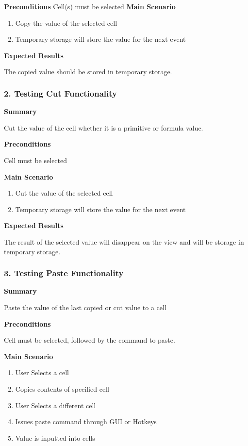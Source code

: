 \documentclass[12pt]{article}
\begin{document}
\noindent
{\bf Preconditions}
Cell(s) must be selected
\noindent
{\bf Main Scenario}
\begin{enumerate}
	\item Copy the value of the selected cell
	\item Temporary storage will store the value for the next event
\end{enumerate}

\noindent
{\bf Expected Results}

The copied value should be stored in temporary storage.

\subsubsection{2. Testing Cut Functionality}

\noindent
{\bf Summary}

Cut the value of the cell whether it is a primitive or formula value.

\noindent
{\bf Preconditions}

Cell must be selected

\noindent
{\bf Main Scenario}
\begin{enumerate}
	\item Cut the value of the selected cell
	\item Temporary storage will store the value for the next event 
\end{enumerate}

\noindent
{\bf Expected Results}

The result of the selected value will disappear on the view and will be storage in temporary storage. 


\subsubsection{3. Testing Paste Functionality}

\noindent
{\bf Summary}

Paste the value of the last copied or cut value to a cell

\noindent
{\bf Preconditions}

Cell must be selected, followed by the command to paste. 

\noindent
{\bf Main Scenario}
\begin{enumerate}
	\item User Selects a cell
	\item Copies contents of specified cell
	\item User Selects a different cell
	\item Issues paste command through GUI or Hotkeys
	\item Value is inputted into cells
\end{enumerate}
\end{document}
